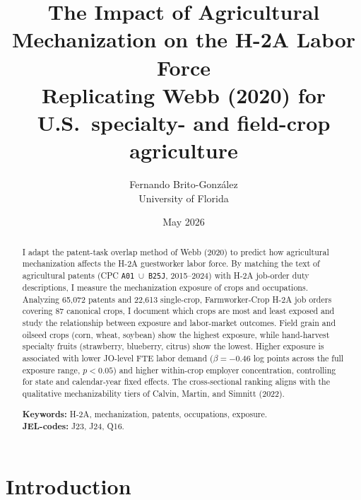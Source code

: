 \documentclass[11pt]{article}
\title{The Impact of Agricultural Mechanization on the H-2A Labor Force\\
       \large Replicating Webb (2020) for U.S.\ specialty- and field-crop agriculture}
\author{Fernando Brito-Gonz\'{a}lez\\University of Florida}
\date{May 2026}
\begin{document}
\maketitle

\begin{abstract}
\noindent
I adapt the patent-task overlap method of Webb (2020) to predict how agricultural mechanization affects the H-2A guestworker labor force. By matching the text of agricultural patents (CPC \texttt{A01}~$\cup$~\texttt{B25J}, 2015--2024) with H-2A job-order duty descriptions, I measure the mechanization exposure of crops and occupations. Analyzing 65{,}072 patents and 22{,}613 single-crop, Farmworker-Crop H-2A job orders covering 87 canonical crops, I document which crops are most and least exposed and study the relationship between exposure and labor-market outcomes. Field grain and oilseed crops (corn, wheat, soybean) show the highest exposure, while hand-harvest specialty fruits (strawberry, blueberry, citrus) show the lowest. Higher exposure is associated with lower JO-level FTE labor demand ($\beta = -0.46$ log points across the full exposure range, $p < 0.05$) and higher within-crop employer concentration, controlling for state and calendar-year fixed effects. The cross-sectional ranking aligns with the qualitative mechanizability tiers of Calvin, Martin, and Simnitt (2022).

\medskip
\noindent\textbf{Keywords:} H-2A, mechanization, patents, occupations, exposure.\\
\textbf{JEL-codes:} J23, J24, Q16.
\end{abstract}

\section{Introduction}
\end{document}
